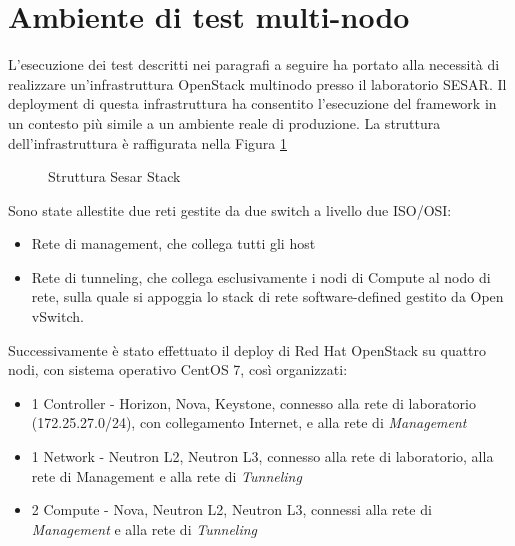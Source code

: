 \documentclass[../main.tex]{subfiles}
\begin{document}
\section{Ambiente di test multi-nodo}
L'esecuzione dei test descritti nei paragrafi a seguire ha portato alla necessità di realizzare un'infrastruttura OpenStack multinodo presso il laboratorio SESAR.
Il deployment di questa infrastruttura ha consentito l'esecuzione del framework in un contesto più simile a un ambiente reale di produzione.
La struttura dell'infrastruttura è raffigurata nella Figura \ref{SesarStack}
\begin{figure}[H]
\centering
{}
\caption{Struttura Sesar Stack}\label{SesarStack}
\end{figure}
Sono state allestite due reti gestite da due switch a livello due ISO/OSI:
\begin{itemize}
\item Rete di management, che collega tutti gli host
\item Rete di tunneling, che collega esclusivamente i nodi di Compute al nodo di rete, sulla quale si appoggia lo stack di rete software-defined gestito da Open vSwitch.
\end{itemize}
Successivamente è stato effettuato il deploy di Red Hat OpenStack su quattro nodi, con sistema operativo CentOS 7, così organizzati:
\begin{itemize}
\item 1 Controller - Horizon, Nova, Keystone, connesso alla rete di laboratorio (172.25.27.0/24), con collegamento Internet,  e alla rete di \textit{Management}
\item 1 Network - Neutron L2, Neutron L3, connesso alla rete di laboratorio, alla rete di Management e alla rete di \textit{Tunneling}
\item 2 Compute - Nova, Neutron L2, Neutron L3, connessi alla rete di \textit{Management} e alla rete di \textit{Tunneling}
\end{itemize}
\end{document}
